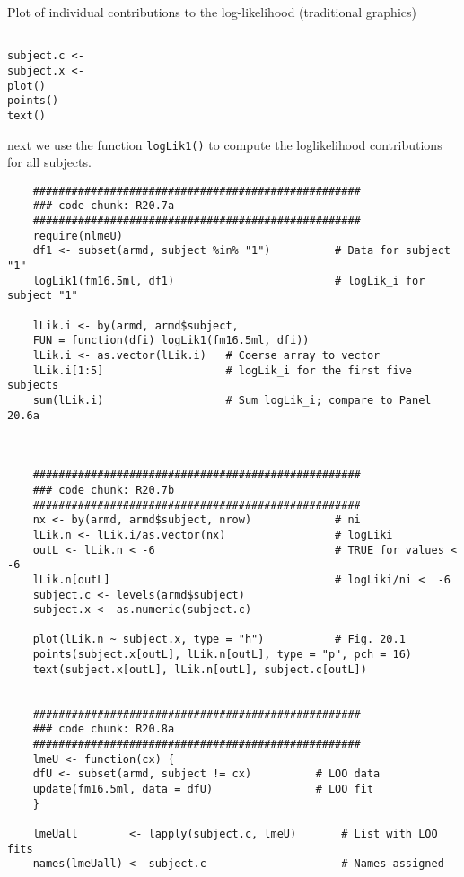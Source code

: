 \documentclass[a4paper,12pt]{article}
\begin{document}
Plot of individual contributions to the log-likelihood (traditional graphics)
\begin{framed}
\begin{verbatim}

subject.c <-
subject.x <- 
plot()
points()
text()
\end{verbatim}
\end{framed}

next we use the function \texttt{logLik1()} to compute the loglikelihood
contributions for all subjects.

\newpage


\begin{framed}
	\begin{verbatim}
	###################################################
	### code chunk: R20.7a
	###################################################
	require(nlmeU)  
	df1 <- subset(armd, subject %in% "1")          # Data for subject "1" 
	logLik1(fm16.5ml, df1)                         # logLik_i for subject "1" 
	
	lLik.i <- by(armd, armd$subject,
	FUN = function(dfi) logLik1(fm16.5ml, dfi))
	lLik.i <- as.vector(lLik.i)   # Coerse array to vector  
	lLik.i[1:5]                   # logLik_i for the first five subjects
	sum(lLik.i)                   # Sum logLik_i; compare to Panel 20.6a
	
	
	
	###################################################
	### code chunk: R20.7b
	###################################################
	nx <- by(armd, armd$subject, nrow)             # ni
	lLik.n <- lLik.i/as.vector(nx)                 # logLiki
	outL <- lLik.n < -6                            # TRUE for values < -6
	lLik.n[outL]                                   # logLiki/ni <  -6
	subject.c <- levels(armd$subject)
	subject.x <- as.numeric(subject.c)
	
	plot(lLik.n ~ subject.x, type = "h")           # Fig. 20.1
	points(subject.x[outL], lLik.n[outL], type = "p", pch = 16)
	text(subject.x[outL], lLik.n[outL], subject.c[outL])
	
	
	###################################################
	### code chunk: R20.8a
	###################################################
	lmeU <- function(cx) { 
	dfU <- subset(armd, subject != cx)          # LOO data 
	update(fm16.5ml, data = dfU)                # LOO fit 
	}
	
	lmeUall        <- lapply(subject.c, lmeU)       # List with LOO fits
	names(lmeUall) <- subject.c                     # Names assigned          
	
	\end{verbatim}
\end{framed}
\newpage
\end{document}
